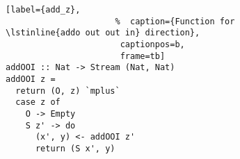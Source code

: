 \begin{figure}[!t]
  \centering
  \begin{minipage}{\columnwidth}
    \begin{lstlisting}[label={add_z},
                      %  caption={Function for \lstinline{addo out out in} direction},
                       captionpos=b,
                       frame=tb]
addOOI :: Nat -> Stream (Nat, Nat)
addOOI z =
  return (O, z) `mplus`
  case z of
    O -> Empty
    S z' -> do
      (x', y) <- addOOI z'
      return (S x', y)
    \end{lstlisting}
  \end{minipage}
\end{figure}